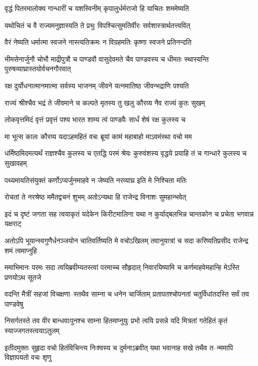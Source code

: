 \twolineshloka
{वृद्धं पितरमालोक्य गान्धारीं च यशस्विनीम्}
{कृपालुर्धर्मराजो हि याचितः शममेष्यति}


\twolineshloka
{यथोचितं च वै राज्यमनुज्ञास्यति ते प्रभुः}
{विपश्चित्सुमतिर्वीरः सर्वशास्त्रार्थतत्त्ववित्}


\twolineshloka
{वैरं नेष्यति धर्मात्मा स्वजने नास्त्यतिक्रमः}
{न विग्रहमतिः कृष्णा स्वजने प्रतिनन्दति}


\threelineshloka
{भीमसेनार्जुनौ चोभौ माद्रीपुत्रौ च पाण्डवौ}
{वासुदेवमते चैव पाण्डवस्य च धीमतः}
{स्थास्यन्ति पुरुषव्याघ्रास्तयोर्वचनगौरवात्}


\twolineshloka
{रक्ष दुर्योधनात्मानमात्मा सर्वस्य भाजनम्}
{जीवने यत्नमातिष्ठ जीवन्भद्राणि पश्यति}


\twolineshloka
{राज्यं श्रीश्चैव भद्रं ते जीवमाने च कल्पते}
{मृतस्य तु खलु कौरव्य नैव राज्यं कुतः सुखम्}


\twolineshloka
{लोकवृत्तमिदं वृत्तं प्रवृत्तं पश्य भारत}
{शाम्य त्वं पाण्डवैः सार्धं शेषं रक्ष कुलस्य च}


\twolineshloka
{मा भूत्स कालः कौरव्य यदाऽहमहितं वचः}
{ब्रूयां कामं महाबाहो माऽवमंस्था वचो मम}


\threelineshloka
{धर्मिष्ठमिदमत्यर्थं राज्ञश्चैव कुलस्य च}
{एतद्धि परमं श्रेयः कुरुवंशस्य वृद्धये}
{प्रयाहि तं च गान्धारे कुलस्य च सुखावहम्}


\twolineshloka
{पथ्यमायतिसंयुक्तं कर्णोऽप्यर्जुनमाहवे}
{न जेष्यति नरव्याघ्र इति मे निश्चिता मतिः}


\twolineshloka
{रोचतां ते नरश्रेष्ठ ममैतद्वचनं शुभम्}
{अतोऽन्यथा हि राजेन्द्र विनाशः सुमहान्भवेत्}


\twolineshloka
{इदं च दृष्टं जगता सह त्वयाकृतं यदेकेन किरीटमालिना}
{यथा न कुर्याद्बलभिन्न चान्तकोन च प्रचेता भगवान्न यक्षराट्}


\twolineshloka
{अतोऽपि भूयान्स्वगुणैर्धनञ्जयोन चातिवर्तिष्यति मे वचोऽखिलम्}
{तवानुयात्रां च सदा करिष्यतिप्रसीद राजेन्द्र शमं त्वमाप्नुहि}


\twolineshloka
{ममाभिमानः परमः सदा त्वयिब्रवीम्यतस्त्वां परमाच्च सौहृदात्}
{निवारयिष्यामि च कर्णमाहवेमहान्हि मेऽस्ति प्रणयोऽथ सूतजे}


\twolineshloka
{वदन्ति मैत्रीं सहजां विचक्षणा--स्तथैव साम्ना च धनेन चार्जिताम्}
{प्रतापतश्चोपनतां चतुर्विधांतदस्ति सर्वं तव पाण्डवेषु}


\twolineshloka
{निसर्गतस्ते तव वीर बान्धवाःपुनश्च साम्ना हितमाप्नुयुः प्रभो}
{त्वयि प्रसन्ने यदि मित्रतां गतेहितं कृतं स्याज्जगतस्त्वयाऽतुलम्}


\twolineshloka
{इतीदमुक्तः सुहृदा वचो हितंविचिन्त्य निःश्वस्य च दुर्मनाऽब्रवीत्}
{यथा भवानाह सखे तथैव त--न्ममापि विज्ञापयतो वचः शृणु}


